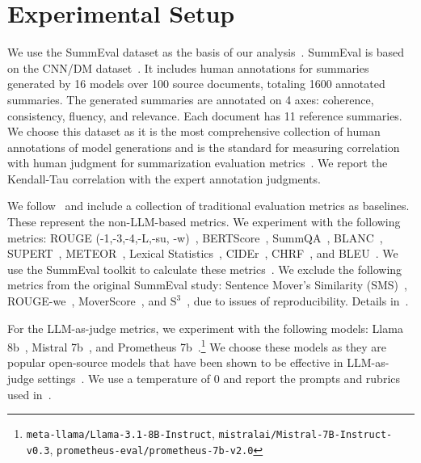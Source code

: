
\section{Experimental Setup}\label{sec:6-chapter-experimental-setup}

We use the SummEval dataset as the basis of our analysis~\cite{fabbri2021summeval}. SummEval is based on the CNN/DM dataset~\cite{Hermann2015TeachingMT,Nallapati2016AbstractiveTS}. It includes human annotations for summaries generated by 16 models over 100 source documents, totaling 1600 annotated summaries. The generated summaries are annotated on 4 axes: coherence, consistency, fluency, and relevance.  Each document has 11 reference summaries. We choose this dataset as it is the most comprehensive collection of human annotations of model generations and is the standard for measuring correlation with human judgment for summarization evaluation metrics~\cite{fabbri2021summeval,liu2023geval}. We report the Kendall-Tau correlation with the expert annotation judgments.

We follow~\textcite{fabbri2021summeval} and include a collection of traditional evaluation metrics as baselines. These represent the non-LLM-based metrics. We experiment with the following metrics: ROUGE (-1,-3,-4,-L,-su, -w)~\cite{lin2004rouge},  BERTScore~\cite{zhang2020bertscore},  SummQA~\cite{scialom2019summa}, BLANC~\cite{vasilyev2020blanc}, SUPERT~\cite{gao2020supert}, METEOR~\cite{banerjee2005meteor}, Lexical Statistics~\cite{fabbri2021summeval}, CIDEr~\cite{vedantam2015cider}, CHRF~\cite{popovic-2015-chrf}, and BLEU~\cite{papineni2002bleu}. We use the SummEval toolkit to calculate these metrics~\cite{fabbri2021summeval}.  We exclude the following metrics from the original SummEval study: Sentence Mover's Similarity (SMS)~\cite{clark-etal-2019-sentence}, ROUGE-we~\cite{ng-abrecht-2015-better}, MoverScore~\cite{zhao2019moverscore}, and $\mathrm{S}^3$~\cite{peyrard-eckle-kohler-2017-principled}, due to issues of reproducibility. Details in~.

For the LLM-as-judge metrics, we experiment with the following models: Llama 8b~\cite{grattafiori2024llama3}, Mistral 7b~\cite{jiang2023mistral7b}, and Prometheus 7b~\cite{kim2023prometheus}.\footnote{\texttt{meta-llama/Llama-3.1-8B-Instruct}, \texttt{mistralai/Mistral-7B-Instruct-v0.3}, \texttt{prometheus-eval/prometheus-7b-v2.0}} We choose these models as they are popular open-source models that have been shown to be effective in LLM-as-judge settings~\cite{zheng2023judging,kim2023prometheus}. We use a temperature of $0$ and report the prompts and rubrics used in~. 



